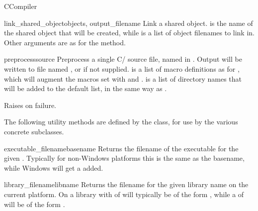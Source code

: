 \documentclass{manual}
\begin{document}
\begin{classdesc}{CCompiler}{}
\begin{methoddesc}{link_shared_object}{objects, output_filename}
Link a shared object.  is the name of the shared object
that will be created, while  is a list of object filenames 
to link in. Other arguments are as for the  method. 
\end{methoddesc}

\begin{methoddesc}{preprocess}{source}
Preprocess a single C/\Cpp{} source file, named in .
Output will be written to file named , or  if
 not supplied.   is a list of macro
definitions as for , which will augment the macros set
with  and .  
 is a list of directory names that will be added to the 
default list, in the same way as .

Raises  on failure.
\end{methoddesc}

The following utility methods are defined by the  class,
for use by the various concrete subclasses.

\begin{methoddesc}{executable_filename}{basename}
Returns the filename of the executable for the given . 
Typically for non-Windows platforms this is the same as the basename, 
while Windows will get a  added.
\end{methoddesc}

\begin{methoddesc}{library_filename}{libname}
Returns the filename for the given library name on the current platform.
On \UNIX{} a library with  of  will typically 
be of the form , while a  of  
will be of the form .
\end{methoddesc}


\end{classdesc}
\end{document}
